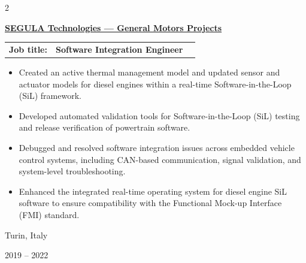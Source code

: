 \documentclass[10pt, letterpaper]{article}
\newenvironment{highlights}{
    \begin{itemize}[
        topsep=0.10 cm,
        parsep=0.10 cm,
        partopsep=0pt,
        itemsep=0pt,
        leftmargin=0.2 cm + 10pt
    ]
}{
    \end{itemize}
} %
\newenvironment{twocolentry}[2][]{
    \onecolentry
    \def\secondColumn{#2}
    \setcolumnwidth{\fill, 2.8 cm}
    \begin{paracol}{2}
}{
    \switchcolumn \raggedleft \secondColumn
    \end{paracol}
    \endonecolentry
} %
\let\hrefWithoutArrow\href
\renewcommand{\href}[2]{\hrefWithoutArrow{#1}{#2}}
\begin{document}
        \vspace{1 em}
        \begin{twocolentry}{
            Turin, Italy 

        2019 – 2022
        }
            \textbf{{\href{https://www.segulatechnologies.com/en/}{\color{black}\Large{SEGULA Technologies --- General Motors Projects}}}} \\
\vspace{-.6em}

            \begin{tabular}{ l l l }
            \textbf{Job title:} &  \textbf{Software Integration Engineer }    \\  
            \end{tabular}
                      
            \begin{highlights}
                \item Created an active thermal management model and updated sensor and actuator models for diesel engines within a real-time Software-in-the-Loop (SiL) framework.           
                \item Developed automated validation tools for Software-in-the-Loop (SiL) testing and release verification of powertrain software.
                \item Debugged and resolved software integration issues across embedded vehicle control systems, including CAN-based communication, signal validation, and system-level troubleshooting.
                \item Enhanced the integrated real-time operating system for diesel engine SiL software to ensure compatibility with the Functional Mock-up Interface (FMI) standard.
            \end{highlights}
        \end{twocolentry}
        \vspace{.6 cm}
\end{document}
